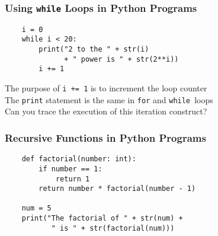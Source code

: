 \documentclass[14pt,aspectratio=169]{beamer}
\begin{document}
%
\begin{frame}[fragile]
  \frametitle{Using {\tt while} Loops in Python Programs}
  \normalsize
  \hspace*{-.65in}
  \begin{minipage}{6in}
    \vspace*{.25in}
    \begin{verbatim}
    i = 0
    while i < 20:
        print("2 to the " + str(i)
              + " power is " + str(2**i))
        i += 1
    \end{verbatim}
  \end{minipage}
  \vspace*{.1in}
  \begin{center}
    \normalsize \noindent The purpose of {\tt i += 1} is to increment the loop counter\\
    \normalsize \noindent The {\tt print} statement is the same in {\tt for} and
    {\tt while }loops\\
    \normalsize \noindent Can you trace the execution of this iteration
    construct?\\
  \end{center}
\end{frame}

%
\begin{frame}[fragile]
  \frametitle{Recursive Functions in Python Programs}
  \hspace*{-.8in}
  \begin{minipage}{6in}
    \begin{verbatim}
    def factorial(number: int):
        if number == 1:
            return 1
        return number * factorial(number - 1)

    num = 5
    print("The factorial of " + str(num) +
           " is " + str(factorial(num)))
    \end{verbatim}
  \end{minipage}
  \vspace*{.05in}
\end{frame}
\end{document}
